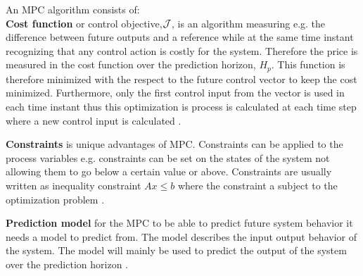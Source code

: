 An MPC algorithm consists of:
\\ 
\textbf{Cost function} or control objective,$\CMcal{J}$, is an algorithm measuring e.g. the difference between future outputs and a reference while at the same time instant recognizing that any control action is costly for the system. Therefore the price is measured in the cost function over the prediction horizon, $H_p$. This function is therefore minimized with the respect to the future control vector to keep the cost minimized. Furthermore, only the first control input from the vector is used in each time instant thus this optimization is process is calculated at each time step where a new control input is calculated \cite{mpc_control_lecture_notes}.

\textbf{Constraints} is unique advantages of MPC. Constraints can be applied to the process variables e.g. constraints can be set on the states of the system not allowing them to go below a certain value or above. Constraints are usually written as inequality constraint $Ax\leq b$ where the constraint a subject to the optimization problem \cite{mpc_control_lecture_notes}.   

\textbf{Prediction model} for the MPC to be able to predict future system behavior it needs a model to predict from. The model describes the input output behavior of the system. The model will mainly be used to predict the output of the system over the prediction horizon \cite{mpc_control_lecture_notes}.  


